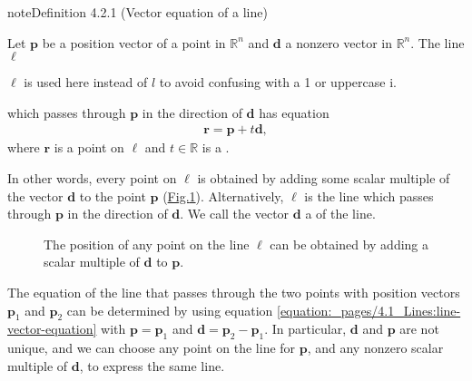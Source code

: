 \documentclass[letterpaper,10pt,english]{jupyterBook}
\let\sphinxpxdimen\pdfpxdimen\else\newdimen\sphinxpxdimen
\begin{document}
\ignorespaces \label{_pages/4.1_Lines:vector-equation-of-a-line-definition}
\begin{sphinxadmonition}{note}{Definition 4.2.1 (Vector equation of a line)}



\sphinxAtStartPar
Let \(\mathbf{p}\) be a position vector of a point in \(\mathbb{R}^n\) and \(\mathbf{d}\) a non\sphinxhyphen{}zero vector in \(\mathbb{R}^n\). The line \(\ell\) %
\begin{footnote}[1]\sphinxAtStartFootnote
\(\ell\) is used here instead of \(l\) to avoid confusing with a 1 or uppercase i.
%
\end{footnote} which passes through \(\mathbf{p}\) in the direction of \(\mathbf{d}\) has equation
\begin{equation}\label{equation:_pages/4.1_Lines:line-vector-equation}
\begin{split} \mathbf{r} = \mathbf{p} + t\mathbf{d}, \end{split}
\end{equation}
\sphinxAtStartPar
where \(\mathbf{r}\) is a point on \(\ell\) and \(t \in \mathbb{R}\) is a .
\end{sphinxadmonition}

\sphinxAtStartPar
In other words, every point on \(\ell\) is obtained by adding some scalar multiple of the vector \(\mathbf{d}\) to the point \(\mathbf{p}\) (\hyperref[\detokenize{_pages/4.1_Lines:line-vector-equation-figure}]{Fig.\@ \ref{\detokenize{_pages/4.1_Lines:line-vector-equation-figure}}}). Alternatively, \(\ell\) is the line which passes through \(\mathbf{p}\) in the direction of \(\mathbf{d}\). We call the vector \(\mathbf{d}\) a  of the line.

\begin{figure}[htbp]
\centering
\capstart

\noindent\sphinxincludegraphics[width=500\sphinxpxdimen]{{4_vector_equation_of_a_line}.svg}
\caption{The position of any point on the line \(\ell\) can be obtained by adding a scalar multiple of \(\mathbf{d}\) to \(\mathbf{p}\).}\label{\detokenize{_pages/4.1_Lines:line-vector-equation-figure}}\end{figure}

\sphinxAtStartPar
The equation of the line that passes through the two points with position vectors \(\mathbf{p}_1\) and \(\mathbf{p}_2\) can be determined by using equation \eqref{equation:_pages/4.1_Lines:line-vector-equation} with \(\mathbf{p} = \mathbf{p}_1\) and \(\mathbf{d} = \mathbf{p}_2 - \mathbf{p}_1\). In particular, \(\mathbf{d}\) and \(\mathbf{p}\) are not unique, and we can choose any point on the line for \(\mathbf{p}\), and any non\sphinxhyphen{}zero scalar multiple of \(\mathbf{d}\), to express the same line.
\end{document}

